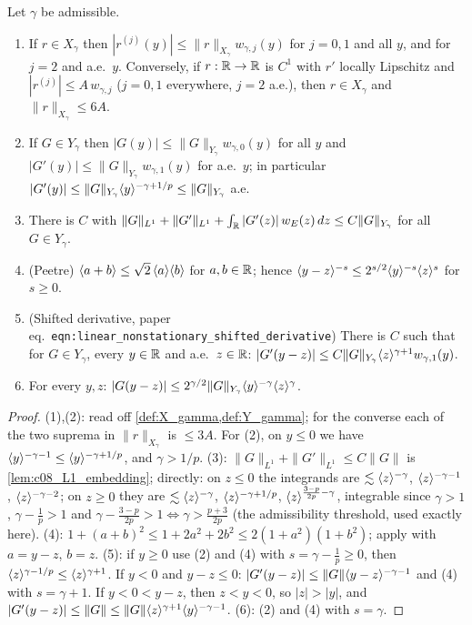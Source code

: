 \begin{lemma}
  \label{lem:c09_weight_facts}
  Let $\gamma$ be admissible.
  \begin{enumerate}
    \item If $r\in X_\gamma$ then $|r^{(j)}(y)|\le\|r\|_{X_\gamma}w_{\gamma,j}(y)$ for $j=0,1$ and all $y$, and for $j=2$ and a.e.\ $y$.
      Conversely, if $r:\mathbb{R}\to\mathbb{R}$ is $C^1$ with $r'$ locally Lipschitz and $|r^{(j)}|\le A\,w_{\gamma,j}$ ($j=0,1$ everywhere, $j=2$ a.e.),
      then $r\in X_\gamma$ and $\|r\|_{X_\gamma}\le 6A$.
    \item If $G\in Y_\gamma$ then $|G(y)|\le\|G\|_{Y_\gamma}w_{\gamma,0}(y)$ for all $y$ and $|G'(y)|\le\|G\|_{Y_\gamma}w_{\gamma,1}(y)$ for a.e.\ $y$;
      in particular $|G'(y)|\le\|G\|_{Y_\gamma}\langle y \rangle^{-\gamma+1/p}\le\|G\|_{Y_\gamma}$ a.e.
    \item There is $C$ with $\|G\|_{L^1}+\|G'\|_{L^1}+\int_{\mathbb{R}}|G'(z)|\,w_E(z)\,dz\le C\|G\|_{Y_\gamma}$ for all $G\in Y_\gamma$.
    \item (Peetre) $\langle a+b \rangle\le\sqrt2\,\langle a \rangle\langle b \rangle$ for $a,b\in\mathbb{R}$; hence $\langle y-z \rangle^{-s}\le2^{s/2}\langle y \rangle^{-s}\langle z \rangle^{s}$ for $s\ge0$.
    \item (Shifted derivative, paper eq.~\texttt{eqn:linear\_nonstationary\_shifted\_derivative}) There is $C$ such that for $G\in Y_\gamma$, every $y\in\mathbb{R}$
      and a.e.\ $z\in\mathbb{R}$: $|G'(y-z)|\le C\|G\|_{Y_\gamma}\langle z \rangle^{\gamma+1}w_{\gamma,1}(y)$.
    \item For every $y,z$: $|G(y-z)|\le 2^{\gamma/2}\|G\|_{Y_\gamma}\langle y \rangle^{-\gamma}\langle z \rangle^{\gamma}$.
  \end{enumerate}
\end{lemma}
\begin{proof}
  (1),(2): read off \cref{def:X_gamma,def:Y_gamma}; for the converse each of the two suprema in $\|r\|_{X_\gamma}$ is $\le3A$.
  For (2), on $y\le0$ we have $\langle y \rangle^{-\gamma-1}\le\langle y \rangle^{-\gamma+1/p}$, and $\gamma>1/p$.
  (3): $\|G\|_{L^1}+\|G'\|_{L^1}\le C\|G\|$ is \cref{lem:c08_L1_embedding}; directly: on $z\le0$ the integrands are $\lesssim\langle z \rangle^{-\gamma}$, $\langle z \rangle^{-\gamma-1}$, $\langle z \rangle^{-\gamma-2}$; on $z\ge0$ they are
  $\lesssim\langle z \rangle^{-\gamma}$, $\langle z \rangle^{-\gamma+1/p}$, $\langle z \rangle^{\frac{3-p}{2p}-\gamma}$, integrable since $\gamma>1$, $\gamma-\frac1p>1$ and
  $\gamma-\frac{3-p}{2p}>1\iff\gamma>\frac{p+3}{2p}$ (the admissibility threshold, used exactly here).
  (4): $1+(a+b)^2\le1+2a^2+2b^2\le2(1+a^2)(1+b^2)$; apply with $a=y-z$, $b=z$.
  (5): if $y\ge0$ use (2) and (4) with $s=\gamma-\frac1p\ge0$, then $\langle z \rangle^{\gamma-1/p}\le\langle z \rangle^{\gamma+1}$.
  If $y<0$ and $y-z\le0$: $|G'(y-z)|\le\|G\|\langle y-z \rangle^{-\gamma-1}$ and (4) with $s=\gamma+1$. If $y<0<y-z$, then
  $z<y<0$, so $|z|>|y|$, and $|G'(y-z)|\le\|G\|\le\|G\|\langle z \rangle^{\gamma+1}\langle y \rangle^{-\gamma-1}$.
  (6): (2) and (4) with $s=\gamma$.
\end{proof}

